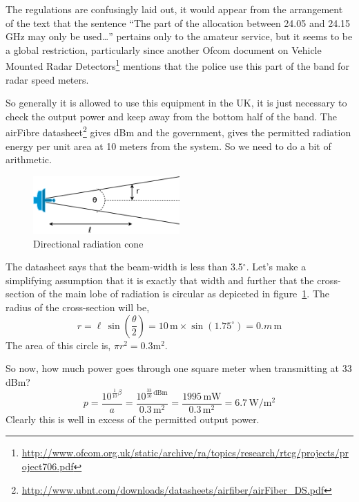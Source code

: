 The regulations are confusingly laid out, it would appear from
the arrangement of the text that the sentence ``The part of the
allocation between 24.05 and 24.15 GHz may only be used\ldots{}''
pertains only to the amateur service, but it seems to be a global
restriction, particularly since another Ofcom document on
Vehicle Mounted Radar
Detectors\footnote{\url{http://www.ofcom.org.uk/static/archive/ra/topics/research/rtcg/projects/project706.pdf}}
mentions that the police use this part of the
band for radar speed meters.

So generally it is allowed to use this equipment in the UK, it is
just necessary to check the output power and keep away from the bottom
half of the band. The airFibre datasheet\footnote{\url{http://www.ubnt.com/downloads/datasheets/airfiber/airFiber_DS.pdf}}
gives dBm and the
government, gives the permitted radiation energy per unit area at 10
meters from the system. So we need to do a bit of arithmetic.
\begin{figure}
\includegraphics[width=0.5\textwidth]{radiation-cone}
\caption{Directional radiation cone}
\label{fig:cone}
\end{figure}

The datasheet says that the beam-width is less than 3.5$^\circ$. Let's make a
simplifying assumption that it is exactly that width and further that
the cross-section of the main lobe of radiation is circular as
depiceted in figure~\ref{fig:cone}. The radius of the cross-section will be,
\begin{equation}
r = \ell\, \sin\left(\frac{\theta}{2}\right) 
  = 10\,\text{m} \times \sin\left(1.75^\circ\right) = 0.m\,\text{m}
\end{equation}
The area of this circle is, $\pi r^2 = 0.3 \text{m}^2$.

So now, how much power goes through one square meter when
transmitting at 33 dBm?
\begin{equation}
\label{eq:dens2power}
p = \frac{10^{\frac{1}{10}\beta}}{a}  = \frac{10 ^ {\frac{33}{10}\,\text{dBm}}}{0.3\,\text{m}^2} = 
\frac{1995\,\text{mW}}{0.3\,\text{m}^2} = 6.7\,\text{W}/\text{m}^2
\end{equation}
Clearly this is well in excess of the permitted output power.

